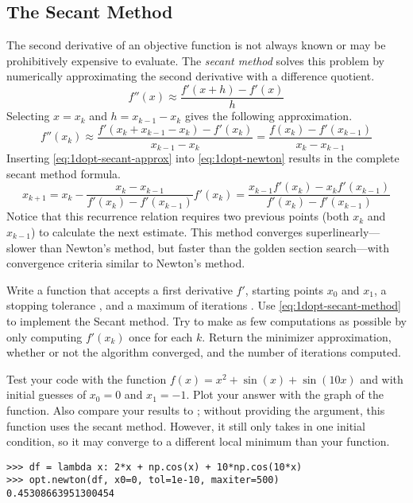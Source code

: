 \subsection*{The Secant Method} %

The second derivative of an objective function is not always known or may be prohibitively expensive to evaluate.
The \emph{secant method} solves this problem by numerically approximating the second derivative with a difference quotient.
\[
f''(x) \approx \frac{f'(x + h) - f'(x)}{h}
\]
Selecting $x = x_k$ and $h = x_{k-1} - x_k$ gives the following approximation.
\begin{equation}
f''(x_k) \approx \frac{f'(x_k + x_{k-1} - x_k) - f'(x_k)}{x_{k-1} - x_k}
= \frac{f(x_k) - f'(x_{k-1})}{x_k - x_{k-1}}
\label{eq:1dopt-secant-approx}
\end{equation}
Inserting \eqref{eq:1dopt-secant-approx} into \eqref{eq:1dopt-newton} results in the complete secant method formula.
\begin{equation}
x_{k+1}
= x_k - \frac{x_k - x_{k-1}}{f'(x_k) - f'(x_{k-1})}f'(x_k)
= \frac{x_{k-1}f'(x_k) - x_{k}f'(x_{k-1})}{f'(x_k) - f'(x_{k-1})}
\label{eq:1dopt-secant-method}
\end{equation}
Notice that this recurrence relation requires two previous points (both $x_{k}$ and $x_{k-1}$) to calculate the next estimate.
This method converges superlinearly---slower than Newton's method, but faster than the golden section search---with convergence criteria similar to Newton's method.

\begin{problem} %
Write a function that accepts a first derivative $f'$, starting points $x_0$ and $x_1$, a stopping tolerance , and a maximum of iterations .
Use \eqref{eq:1dopt-secant-method} to implement the Secant method.
Try to make as few computations as possible by only computing $f'(x_k)$ once for each $k$.
Return the minimizer approximation, whether or not the algorithm converged, and the number of iterations computed.

Test your code with the function $f(x) = x^2 + \sin(x) + \sin(10x)$ and with initial guesses of $x_0 = 0$ and $x_1 = -1$.
Plot your answer with the graph of the function.
Also compare your results to ; without providing the  argument, this function uses the secant method.
However, it still only takes in one initial condition, so it may converge to a different local minimum than your function.

\begin{lstlisting}
>>> df = lambda x: 2*x + np.cos(x) + 10*np.cos(10*x)
>>> opt.newton(df, x0=0, tol=1e-10, maxiter=500)
0.45308663951300454
\end{lstlisting}
\end{problem}


